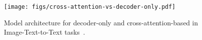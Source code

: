 \begin{figure}[!t]
    \centering
    \texttt{[image: figs/cross-attention-vs-decoder-only.pdf]}
    \caption{Model architecture for decoder-only and cross-attention-based \lmms{} in Image-Text-to-Text tasks~\cite{ittt}.}
    \vspace{-15pt}
    \label{fig:lmm-background}
\end{figure}